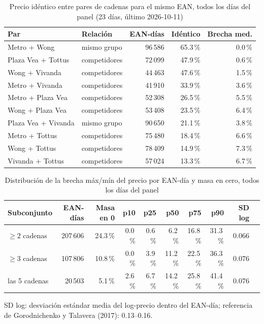 
\begin{table}[htbp]
\caption{Precio id\'entico entre pares de cadenas para el mismo EAN, todos los d\'ias del panel (23 d\'ias, \'ultimo 2026-10-11)}
\label{tab:identidad}
\centering\scriptsize\setlength{\tabcolsep}{3pt}
\begin{tabular}{@{}llrrr@{}}
\toprule
Par & Relaci\'on & EAN-d\'ias & Id\'entico & Brecha med. \\
\midrule
Metro + Wong & mismo grupo & 96\,586 & 65.3\,\% & 0.0\,\% \\
Plaza Vea + Tottus & competidores & 72\,099 & 47.9\,\% & 0.6\,\% \\
Wong + Vivanda & competidores & 44\,463 & 47.6\,\% & 1.5\,\% \\
Metro + Vivanda & competidores & 41\,910 & 33.9\,\% & 3.6\,\% \\
Metro + Plaza Vea & competidores & 52\,308 & 26.5\,\% & 5.5\,\% \\
Wong + Plaza Vea & competidores & 53\,408 & 23.5\,\% & 6.4\,\% \\
Plaza Vea + Vivanda & mismo grupo & 90\,650 & 21.1\,\% & 3.8\,\% \\
Metro + Tottus & competidores & 75\,480 & 18.4\,\% & 6.6\,\% \\
Wong + Tottus & competidores & 78\,409 & 14.9\,\% & 7.3\,\% \\
Vivanda + Tottus & competidores & 57\,024 & 13.3\,\% & 6.7\,\% \\
\bottomrule\end{tabular}\end{table}

\begin{table}[t]
\caption{Distribuci\'on de la brecha m\'ax/m\'in del precio por EAN-d\'ia y masa en cero, todos los d\'ias del panel}
\label{tab:brecha}
\centering\scriptsize\setlength{\tabcolsep}{4pt}
\begin{tabular}{@{}lrrrrrrrrr@{}}
\toprule
Subconjunto & EAN-d\'ias & Masa en 0 & p10 & p25 & p50 & p75 & p90 & SD log \\
\midrule
$\geq 2$ cadenas & 207\,606 & 24.3\,\% & 0.0\,\% & 0.6\,\% & 6.2\,\% & 16.8\,\% & 31.3\,\% & 0.066 \\
$\geq 3$ cadenas & 107\,806 & 10.8\,\% & 0.0\,\% & 3.9\,\% & 11.2\,\% & 22.5\,\% & 36.3\,\% & 0.076 \\
las 5 cadenas & 20\,503 & 5.1\,\% & 2.6\,\% & 6.7\,\% & 14.2\,\% & 25.8\,\% & 41.4\,\% & 0.076 \\
\bottomrule\end{tabular}
\par\smallskip\raggedright\scriptsize SD log: desviaci\'on est\'andar media del log-precio dentro del EAN-d\'ia; referencia de Gorodnichenko y Talavera (2017): 0.13--0.16.
\end{table}

